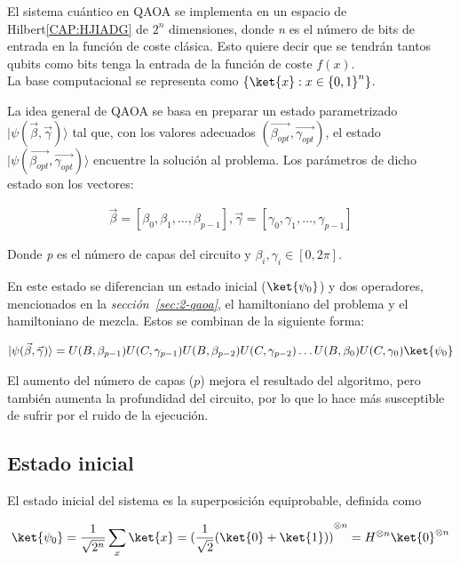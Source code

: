 El sistema cuántico en QAOA se implementa en un espacio de Hilbert\ref{CAP:HJIADG} de $2^n$ dimensiones, donde \textit{n} es el número de bits de entrada en la función de coste clásica. Esto quiere decir que se tendrán tantos qubits como bits tenga la entrada de la función de coste $f(x)$.
\\
La base computacional se representa como $\{\ket{x} : x \in {\{0, 1\}}^n\}$.

La idea general de QAOA se basa en preparar un estado parametrizado \(\lvert \psi(\vec{\beta}, \vec{\gamma})\rangle\) tal que, con los valores adecuados \( (\vec{\beta_{opt}}, \vec{\gamma_{opt}}) \), el estado \(\lvert\psi(\vec{\beta_{opt}}, \vec{\gamma_{opt}})\rangle\) encuentre la solución al problema. Los parámetros de dicho estado son los vectores:

\begin{align}
  \vec{\beta} = [\beta_0, \beta_1, \ldots , \beta_{p-1}], \vec{\gamma} = [\gamma_0, \gamma_1, \ldots , \gamma_{p-1}]
\end{align}

Donde \textit{p} es el número de capas del circuito y $\beta_i, \gamma_i \in{[0, 2\pi]}$.

En este estado se diferencian un estado inicial ($\ket{\psi_0}$) y dos operadores, mencionados en la \textit{sección~\ref{sec:2-qaoa}}, el hamiltoniano del problema y el hamiltoniano de mezcla.
Estos se combinan de la siguiente forma:

\begin{align}
  \lvert \psi(\vec{\beta}, \vec{\gamma})\rangle = U(B, \beta_{p-1})U(C, \gamma_{p-1})U(B, \beta_{p-2})U(C, \gamma_{p-2}) \ldots U(B, \beta_0)U(C, \gamma_0) \ket{\psi_0}
\end{align}

El aumento del número de capas ($p$) mejora el resultado del algoritmo, pero también aumenta la profundidad del circuito, por lo que lo hace más susceptible de sufrir por el ruido de la ejecución.

\subsection{Estado inicial}
El estado inicial del sistema es la superposición equiprobable, definida como

\begin{align}
  \ket{\psi_0} = \frac{1}{\sqrt{2^n}} \sum_x\ket{x}
  = {(\frac{1}{\sqrt{2}} (\ket{0} + \ket{1}))}^{\otimes n}
  = H^{\otimes n} \ket{0}^{\otimes n}
\end{align}

